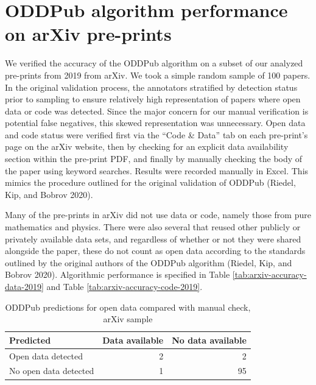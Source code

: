 \documentclass[
]{article}
\begin{document}
\hypertarget{appendix-appendix}{%
\appendix}


\hypertarget{oddpub-algorithm-performance-on-arxiv-pre-prints}{%
\section{ODDPub algorithm performance on arXiv pre-prints}\label{oddpub-algorithm-performance-on-arxiv-pre-prints}}

We verified the accuracy of the ODDPub algorithm on a subset of our analyzed pre-prints from 2019 from arXiv. We took a simple random sample of 100 papers. In the original validation process, the annotators stratified by detection status prior to sampling to ensure relatively high representation of papers where open data or code was detected. Since the major concern for our manual verification is potential false negatives, this skewed representation was unnecessary. Open data and code status were verified first via the ``Code \& Data'' tab on each pre-print's page on the arXiv website, then by checking for an explicit data availability section within the pre-print PDF, and finally by manually checking the body of the paper using keyword searches. Results were recorded manually in Excel. This mimics the procedure outlined for the original validation of ODDPub (Riedel, Kip, and Bobrov 2020).

Many of the pre-prints in arXiv did not use data or code, namely those from pure mathematics and physics. There were also several that reused other publicly or privately available data sets, and regardless of whether or not they were shared alongside the paper, these do not count as open data according to the standards outlined by the original authors of the ODDPub algorithm (Riedel, Kip, and Bobrov 2020). Algorithmic performance is specified in Table \ref{tab:arxiv-accuracy-data-2019} and Table \ref{tab:arxiv-accuracy-code-2019}.

\begin{table}[!h]

\caption{\label{tab:arxiv-confusion-data-2019}ODDPub predictions for open data compared with manual check, arXiv sample}
\centering
\begin{tabular}[t]{lrr}
\toprule
Predicted & Data available & No data available\\
\midrule
Open data detected & 2 & 2\\
No open data detected & 1 & 95\\
\bottomrule
\end{tabular}
\end{table}
\end{document}
